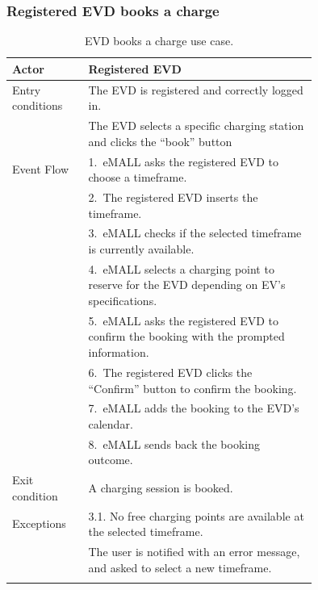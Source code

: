 \subsubsection*{Registered EVD books a charge}
\begin{center}
    \begin{longtable}{lp{0.75\linewidth}}
        \hline
        Actor            & Registered EVD                                                                              \\
        \hline
        Entry conditions & The EVD is registered and correctly logged in.                                              \\
        & The EVD selects a specific charging station and clicks the ``book'' button                  \\
        \hline
        Event Flow       & 1.\ eMALL asks the registered EVD to choose a timeframe.                                    \\
        & 2.\ The registered EVD inserts the timeframe.                                               \\
        & 3.\ eMALL checks if the selected timeframe is currently available.                          \\
        & 4.\ eMALL selects a charging point to reserve for the EVD depending on EV's specifications. \\
        & 5.\ eMALL asks the registered EVD to confirm the booking with the prompted information.     \\
        & 6.\ The registered EVD clicks the ``Confirm'' button to confirm the booking.                \\
        & 7.\ eMALL adds the booking to the EVD's calendar.                                           \\
        & 8.\ eMALL sends back the booking outcome.                                                   \\
        \hline
        Exit condition   & A charging session is booked.                                                               \\
        \hline
        Exceptions       & 3.1. No free charging points are available at the selected timeframe.                       \\
        & The user is notified with an error message, and asked to select a new timeframe.            \\
        \hline
        \caption{EVD books a charge use case.}
        \label{tab: EVD_booking_use_case}
    \end{longtable}
\end{center}

